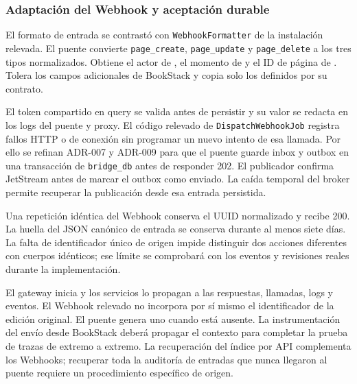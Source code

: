 \subsubsection{Adaptación del Webhook y aceptación durable}
El formato de entrada se contrastó con \texttt{WebhookFormatter} de la
instalación relevada. El puente convierte \texttt{page\_create},
\texttt{page\_update} y \texttt{page\_delete} a los tres tipos normalizados.
Obtiene el actor de , el momento de 
y el ID de página de . Tolera los campos adicionales
de BookStack y copia solo los definidos por su contrato.

El token compartido en query se valida antes de persistir y su valor se
redacta en los logs del puente y proxy. El código relevado de
\texttt{DispatchWebhookJob} registra fallos HTTP o de conexión sin
programar un nuevo intento de esa llamada. Por ello se refinan ADR-007 y
ADR-009 para que el puente guarde inbox y outbox en una transacción de
\texttt{bridge\_db} antes de responder 202. El publicador confirma
JetStream antes de marcar el outbox como enviado. La caída temporal del
broker permite recuperar la publicación desde esa entrada persistida.

Una repetición idéntica del Webhook conserva el UUID normalizado y recibe
200. La huella del JSON canónico de entrada se conserva durante al menos
siete días. La falta de identificador único de origen impide distinguir
dos acciones diferentes con cuerpos idénticos; ese límite se comprobará
con los eventos y revisiones reales durante la implementación.

El gateway inicia  y los servicios lo propagan a las
respuestas, llamadas, logs y eventos. El Webhook relevado no incorpora por
sí mismo el identificador de la edición original. El puente genera uno
cuando está ausente. La instrumentación del envío desde BookStack deberá
propagar el contexto para completar la prueba de trazas de extremo a
extremo. La recuperación del índice por API complementa los Webhooks;
recuperar toda la auditoría de entradas que nunca llegaron al puente
requiere un procedimiento específico de origen.

